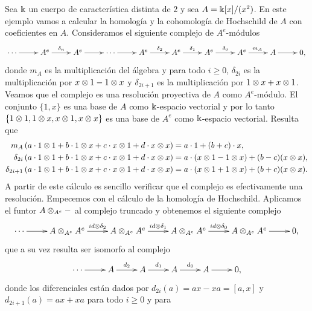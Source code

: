 \documentclass[a4paper,oneside,fleqn,11pt,../tesis.tex]{subfiles}
\begin{document}
\begin{example}\label{example_x2}
	Sea $\Bbbk$ un cuerpo de característica distinta de $2$ y sea $A = \Bbbk[x]/(x^2)$. En este ejemplo vamos
	a calcular la homología y la cohomología de Hochschild de $A$ con coeficientes en $A$. Consideramos
	el siguiente complejo de $A^e$-módulos
	\begin{align*}
		\xymatrix{
		\cdots \ar[r] & A^e \ar[r]^{\delta_n} & A^e \ar[r] &\cdots \ar[r] & A^e \ar[r]^{\delta_2} & A^e \ar[r]^{\delta_1}
			& A^e \ar[r]^{\delta_0} & A^e \ar[r]^{m_A} & A \ar[r] & 0,
		}
	\end{align*}	
	donde $m_A$ es la multiplicación del álgebra y para todo $i \geq 0$, $\delta_{2i}$ es la multiplicación por $ x \otimes 1 - 1\otimes x$  y
	$\delta_{2i + 1}$ es la multiplicación por $1 \otimes x + x \otimes 1$. Veamos que el complejo es una resolución proyectiva de $A$ como $A^e$-módulo.
	El conjunto $\lbrace 1,x \rbrace$ es una base de $A$ como $\Bbbk$-espacio vectorial
	y por lo tanto $\lbrace 1\otimes 1, 1 \otimes x, x \otimes 1, x \otimes x\rbrace$ es una base de $A^e$ como $\Bbbk$-espacio vectorial. Resulta que
	\begin{align*}
		m_A\left( a \cdot 1\otimes 1 + b \cdot 1 \otimes x +  c \cdot x \otimes 1 + d \cdot x \otimes x\right) &= a \cdot 1 + (b + c) \cdot x,\\
		\delta_{2i}\left( a \cdot 1\otimes 1 + b \cdot 1 \otimes x +  c \cdot x \otimes 1 + d \cdot x \otimes x\right) &= a\cdot ( x \otimes 1 - 1\otimes x)
			+ (b - c)(x \otimes x),\\
		\delta_{2i + 1}\left( a \cdot 1\otimes 1 + b \cdot 1 \otimes x +  c \cdot x \otimes 1 + d \cdot x \otimes x\right) &= a\cdot ( x \otimes 1 + 1\otimes x)
			+ (b + c)(x \otimes x).
	\end{align*}
	A partir de este cálculo es sencillo verificar que el complejo es efectivamente una resolución.
	Empecemos con el cálculo de la homología de Hochschild. Aplicamos el funtor $A\otimes_{A^e}-$ al complejo truncado
	y obtenemos el siguiente complejo
	\begin{align*}
		\xymatrix{
		\cdots \ar[r] & A\ox_{A^e}A^e \ar[r]^{id \ox \delta_2} & A\ox_{A^e}A^e \ar[r]^{id \ox \delta_1}
			& A\ox_{A^e}A^e \ar[r]^{id \ox \delta_0} & A\ox_{A^e}A^e \ar[r] & 0,
		}
	\end{align*}	
	que a su vez resulta ser isomorfo al complejo
	\begin{align*}
		\xymatrix{
			\cdots \ar[r] & A \ar[r]^{d_2} & A \ar[r]^{d_1}
			& A \ar[r]^{d_0} & A \ar[r] & 0,
		}
	\end{align*}
	donde los diferenciales están dados por $d_{2i}(a) = ax - xa = [a, x]$ y $d_{2i + 1}(a) = ax + xa$ para todo $i \geq 0$ y para

\end{example}
\end{document}
